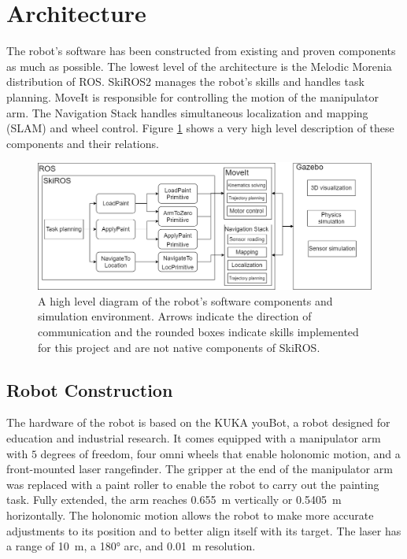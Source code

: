 \section{Architecture} \label{sec:architecture}
The robot's software has been constructed from existing and proven components as much as possible. The lowest level of the architecture is the Melodic Morenia distribution of ROS. SkiROS2 \cite{skiros2} manages the robot's skills and handles task planning. MoveIt \cite{moveit} is responsible for controlling the motion of the manipulator arm. The Navigation Stack \cite{navigation_stack} handles simultaneous localization and mapping (SLAM) and wheel control. Figure \ref{fig:paintbot_arch} shows a very high level description of these components and their relations.

\begin{figure}
    \centering
    \includegraphics[width=0.90\linewidth]{images/architecture.png}
    \caption{A high level diagram of the robot's software components and simulation environment. Arrows indicate the direction of communication and the rounded boxes indicate skills implemented for this project and are not native components of SkiROS.}
    \label{fig:paintbot_arch}
\end{figure}

\subsection{Robot Construction}
The hardware of the robot is based on the KUKA youBot, a robot designed for education and industrial research. It comes equipped with a manipulator arm with $5$ degrees of freedom, four omni wheels that enable holonomic motion, and a front-mounted laser rangefinder. The gripper at the end of the manipulator arm was replaced with a paint roller to enable the robot to carry out the painting task. Fully extended, the arm reaches \SI{0.655}{\meter} vertically or \SI{0.5405}{\meter} horizontally. The holonomic motion allows the robot to make more accurate adjustments to its position and to better align itself with its target. The laser has a range of \SI{10}{\meter}, a \ang{180} arc, and \SI{0.01}{\meter} resolution.


